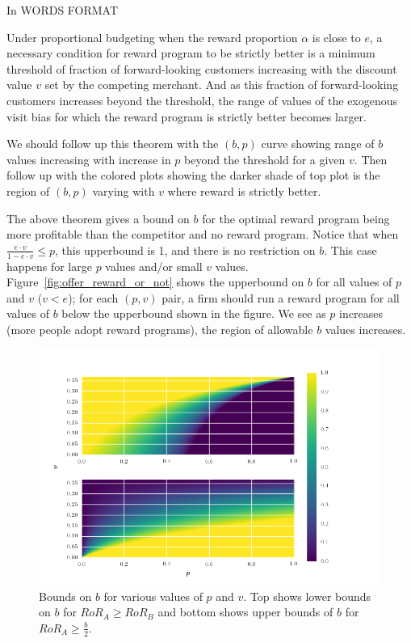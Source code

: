 {\arpit
In WORDS FORMAT

Under proportional budgeting when the reward proportion $\alpha$ is close to $e$, a necessary condition for reward program to be strictly better is a minimum threshold of fraction of forward-looking customers increasing with the discount value $v$ set by the competing merchant.  
And as this fraction of forward-looking customers increases beyond the threshold, the range of values of the exogenous visit bias for which the reward program is strictly better becomes larger. 
}

{\arpit
We should follow up this theorem with the $(b,p)$ curve showing range of $b$ values increasing with increase in $p$ beyond the threshold for a given $v$.
Then follow up with the colored plots showing the darker shade of top plot is the region of $(b,p)$ varying with $v$ where reward is strictly better.
}

The above theorem gives a bound on $b$ for the optimal reward program being more profitable than the competitor and no reward program. 
Notice that when $\frac{e\cdot v}{1-e \cdot v} \leq p$, this upperbound is 1, and there is no restriction on $b$. 
This case happens for large $p$ values and/or small $v$ values. 
Figure~\ref{fig:offer_reward_or_not} shows the upperbound on $b$ for all values of $p$ and $v$ ($v < e$); for each $(p, v)$ pair, a firm should run a reward program for all values of $b$ below the upperbound shown in the figure. 
We see as $p$ increases (more people adopt reward programs), the region of allowable $b$ values increases. 

\begin{figure}[h!]
\begin{centering}
\includegraphics[scale = 0.75]{./figures/b_bounds.png}
\caption{Bounds on $b$ for various values of $p$ and $v$. Top shows lower bounds on $b$ for $RoR_A \geq RoR_B$ and bottom shows upper bounds of $b$ for $RoR_A \geq \frac{b}{2}$.}
\label{fig:b_restrictions}
\end{centering}
\end{figure}

